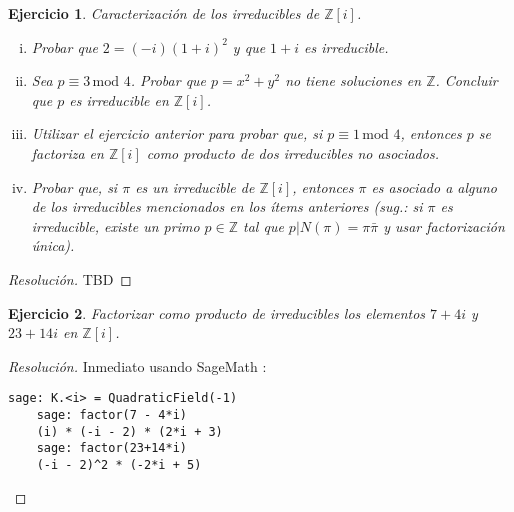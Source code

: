 \documentclass[a4paper,11pt]{article}
\newcommand{\Zm}[1]{\ensuremath{\mathbb{Z}[#1]}}
\newcommand{\Cong}[3]{\ensuremath{#1 \equiv #2 \, \textrm{mod } #3}}
\newcommand{\Div}[2]{\ensuremath{#1 | #2}}
\newtheorem*{ej}{Ejercicio}
\begin{document}
\begin{ej} 
Caracterización de los irreducibles de \Zm{i}.

\begin{enumerate}[i.]
    \item  Probar que $2 = (-i)(1+i)^2$ y que $1+i$ es irreducible.

    \item Sea \Cong{p}{3}{4}. Probar que $p = x^2 + y^2$ no tiene soluciones
    en $\mathbb{Z}$. Concluir que $p$ es irreducible en \Zm{i}.

    \item Utilizar el ejercicio anterior para probar que, si \Cong{p}{1}{4}, entonces
    $p$ se factoriza en \Zm{i} como producto de dos irreducibles no asociados.

    \item Probar que, si $\pi$ es un irreducible de \Zm{i}, entonces $\pi$ es asociado
    a alguno de los irreducibles mencionados en los ítems anteriores (sug.: si $\pi$ es
    irreducible, existe un primo $p \in \mathbb{Z}$ tal que \Div{p}{N(\pi) = \pi \bar{\pi}}
    y usar factorización única).
\end{enumerate}
\end{ej}

\begin{proof}[Resoluci\'on]
TBD
\end{proof}

\begin{ej} 
Factorizar como producto de irreducibles los elementos $7 + 4i$ y $23 + 14i$ en \Zm{i}.
\end{ej}

\begin{proof}[Resoluci\'on]
Inmediato usando SageMath \smiley:

\begin{center}
\begin{minipage}{6.8cm}
    \begin{Verbatim}[frame=single,fontsize=\footnotesize]
    sage: K.<i> = QuadraticField(-1)
    sage: factor(7 - 4*i)
    (i) * (-i - 2) * (2*i + 3)
    sage: factor(23+14*i)
    (-i - 2)^2 * (-2*i + 5)    
    \end{Verbatim}
\end{minipage}
  \end{center}

\end{proof}
\end{document}
